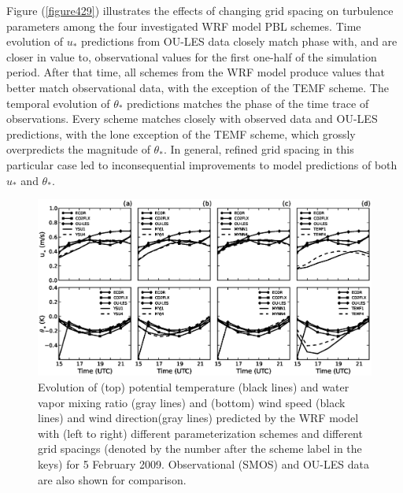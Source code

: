 Figure (\autoref{figure429}) illustrates the effects of changing grid spacing on turbulence parameters among the four investigated WRF model PBL schemes. Time evolution of $u_*$ predictions from OU-LES data closely match phase with, and are closer in value to, observational values for the first one-half of the simulation period. After that time, all schemes from the WRF model produce values that better match observational data, with the exception of the TEMF scheme. The temporal evolution of $\theta_*$ predictions matches the phase of the time trace of observations. Every scheme matches closely with observed data and OU-LES predictions, with the lone exception of the TEMF scheme, which grossly overpredicts the magnitude of $\theta_*$. In general, refined grid spacing in this particular case led to inconsequential improvements to model predictions of both $u_*$ and $\theta_*$. 


\begin{figure}[ht!]
\begin{center}
\includegraphics[width=\textwidth]{figures/chapter4/ust_tst_grid_20090205}
\end{center}
\caption{Evolution of (top) potential temperature (black lines) and water vapor mixing ratio (gray lines) and (bottom) wind speed (black lines) and wind direction(gray lines) predicted by the WRF model with (left to right) different parameterization schemes and different grid spacings (denoted by the number after the scheme label in the keys) for 5 February 2009. Observational (SMOS) and OU-LES data are also shown for comparison.}
\label{figure429}
\end{figure}


